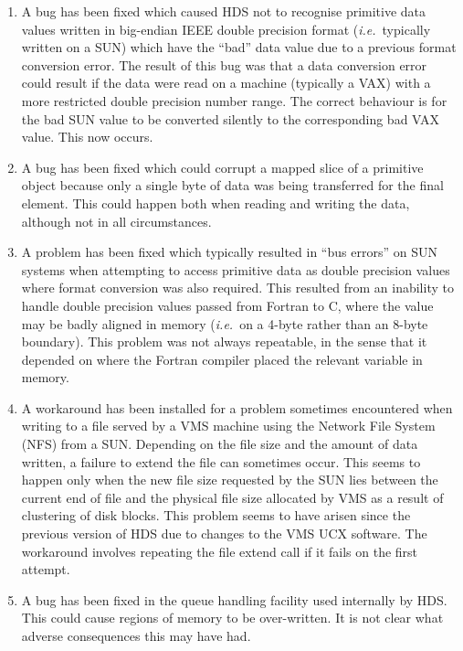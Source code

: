 \documentclass[twoside,11pt]{article}
\renewcommand{\_}{\texttt{\symbol{95}}}
\newcommand{\qt}[1]{``#1''}
\newcommand{\st}[1]{{\em{#1}}}
\newcommand{\qt}[1]{{\tt{"}}#1{\tt{"}}}
\begin{document}
\begin{enumerate}
\item
A bug has been fixed which caused HDS not to recognise primitive data
values written in big-endian IEEE double precision format
(\st{i.e.}\ typically written on a SUN) which have the \qt{bad} data value
due to
a previous format conversion error. The result of this bug was that a
data conversion error could result if the data were read on a machine
(typically a VAX) with a more restricted double precision number
range. The correct behaviour is for the bad SUN value to be converted
silently to the corresponding bad VAX value. This now occurs.

\item
A bug has been fixed which could corrupt a mapped slice of a primitive
object because only a single byte of data was being transferred for
the final element.  This could happen both when reading and writing
the data, although not in all circumstances.

\item
A problem has been fixed which typically resulted in \qt{bus errors}
on SUN systems when attempting to access primitive data as double
precision values where format conversion was also required. This
resulted from an inability to handle double precision values passed
from Fortran to C, where the value may be badly aligned in memory
(\st{i.e.}\ on a 4-byte rather than an 8-byte boundary).  This problem
was not always repeatable, in the sense that it depended on where the
Fortran compiler placed the relevant variable in memory.

\item
A workaround has been installed for a problem sometimes encountered
when writing to a file served by a VMS machine using the Network File
System (NFS) from a SUN. Depending on the file size and the amount of
data written, a failure to extend the file can sometimes occur. This
seems to happen only when the new file size requested by the SUN lies
between the current end of file and the physical file size allocated
by VMS as a result of clustering of disk blocks. This problem seems to
have arisen since the previous version of HDS due to changes to the
VMS UCX software. The workaround involves repeating the file extend
call if it fails on the first attempt.

\item
A bug has been fixed in the queue handling facility used internally by
HDS. This could cause regions of memory to be over-written. It is not
clear what adverse consequences this may have had.


\end{enumerate}
\end{document}
